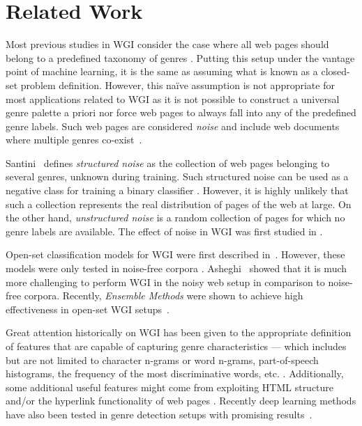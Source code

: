 \documentclass[runningheads]{llncs}
\begin{document}
\section{Related Work}\label{sec:pre_work}
Most previous studies in WGI consider the case where all web pages should belong to a predefined taxonomy of genres \cite{Lim2005,santini2007automatic,kanaris2009learning,jebari2014pure_URL}. Putting this setup under the vantage point of machine learning, it is the same as assuming what is known as a closed-set problem definition. However, this naïve assumption is not appropriate for most applications related to WGI as it is not possible to construct a universal genre palette a priori nor force web pages to always fall into any of the predefined genre labels. Such web pages are considered \textit{noise} and include web documents where multiple genres co-exist~\cite{santini2011cross,levering2008using}. 

Santini~\cite{santini2011cross} defines \textit{structured noise} as the collection of web pages belonging to several genres, unknown during training. Such structured noise can be used as a negative class for training a binary classifier \cite{Vidulin2007}. However, it is highly unlikely that such a collection represents the real distribution of pages of the web at large. On the other hand, \textit{unstructured noise} is a random collection of pages \cite{santini2011cross} for which no genre labels are available. The effect of noise in WGI was first studied in \cite{shepherd2004cybergenre,kennedy2005automatic,dong2006binary,levering2008using}.

Open-set classification models for WGI were first
described in~\cite{pritsos2013open,stubbe2007genre}. However, these models were only tested in noise-free corpora \cite{pritsos2015clef}. Asheghi~\cite{Asheghi2015} showed that it is much more challenging to perform WGI
in the noisy web setup in comparison to noise-free corpora. Recently, \textit{Ensemble Methods} were shown to achieve high effectiveness in open-set WGI setups~\cite{pritsos2018open}.

Great attention historically on WGI has been given to the appropriate definition of features that are capable of capturing genre characteristics --- which includes but are not limited to character n-grams or word n-grams, part-of-speech histograms, the frequency of the most discriminative words, etc.  \cite{kanaris2009learning,kumari2014web,levering2008using,Lim2005,mason2009n,onan2018ensemble,petrenz2011stable,sharoff2010web}.  Additionally, some additional useful features might come from exploiting HTML structure and/or the hyperlink functionality of web pages \cite{abramson2012_URL,asheghi2014semi,jebari2014pure_URL,priyatam2013don_URL,zhu2011enhance}. Recently deep learning methods have also been tested in genre detection setups with promising results~\cite{worsham2018genre}. 
\end{document}
